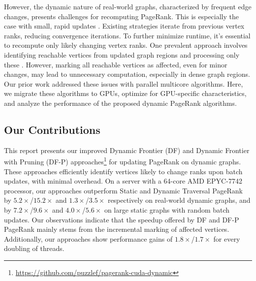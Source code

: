 However, the dynamic nature of real-world graphs, characterized by frequent edge changes, presents challenges for recomputing PageRank. This is especially the case with small, rapid updates \cite{agarwal2012real, barros2021survey}. Existing strategies iterate from previous vertex ranks, reducing convergence iterations. To further minimize runtime, it's essential to recompute only likely changing vertex ranks. One prevalent approach involves identifying reachable vertices from updated graph regions and processing only these \cite{rank-desikan05, kim2015incremental, rank-giri20, sahu2022dynamic}. However, marking all reachable vertices as affected, even for minor changes, may lead to unnecessary computation, especially in dense graph regions. Our prior work \cite{sahu2024df} addressed these issues with parallel multicore algorithms. Here, we migrate these algorithms to GPUs, optimize for GPU-specific characteristics, and analyze the performance of the proposed dynamic PageRank algorithms.




\subsection{Our Contributions}

This report presents our improved Dynamic Frontier (DF) and Dynamic Frontier with Pruning (DF-P) approaches\footnote{\url{https://github.com/puzzlef/pagerank-cuda-dynamic}} for updating PageRank on dynamic graphs. These approaches efficiently identify vertices likely to change ranks upon batch updates, with minimal overhead. On a server with a 64-core AMD EPYC-7742 processor, our approaches outperform Static and Dynamic Traversal PageRank by $5.2\times$/$15.2\times$ and $1.3\times$/$3.5\times$ respectively on real-world dynamic graphs, and by $7.2\times$/$9.6\times$ and $4.0\times$/$5.6\times$ on large static graphs with random batch updates. Our observations indicate that the speedup offered by DF and DF-P PageRank mainly stems from the incremental marking of affected vertices. Additionally, our approaches show performance gains of $1.8\times$/$1.7\times$ for every doubling of threads.

